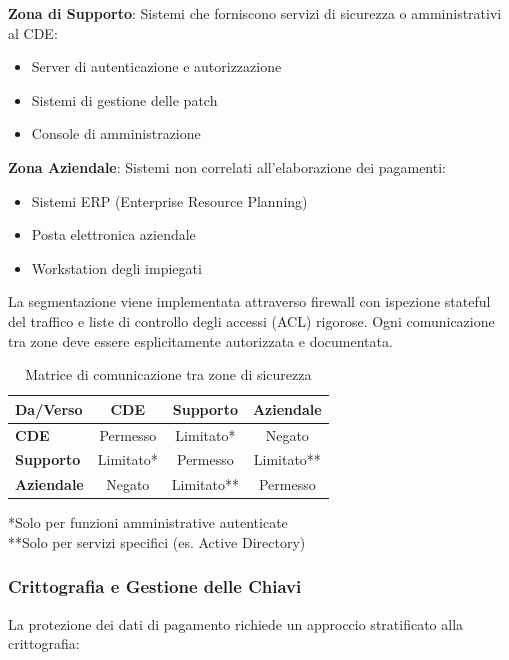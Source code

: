 \textbf{Zona di Supporto}: Sistemi che forniscono servizi di sicurezza o amministrativi al CDE:
\begin{itemize}
    \item Server di autenticazione e autorizzazione
    \item Sistemi di gestione delle patch
    \item Console di amministrazione
\end{itemize}

\textbf{Zona Aziendale}: Sistemi non correlati all'elaborazione dei pagamenti:
\begin{itemize}
    \item Sistemi ERP (Enterprise Resource Planning)
    \item Posta elettronica aziendale
    \item Workstation degli impiegati
\end{itemize}

La segmentazione viene implementata attraverso firewall con ispezione stateful del traffico e liste di controllo degli accessi (ACL) rigorose. Ogni comunicazione tra zone deve essere esplicitamente autorizzata e documentata.

\begin{table}[h]
\centering
\caption{Matrice di comunicazione tra zone di sicurezza}
\label{tab:matrice_comunicazione}
\small
\begin{tabularx}{\textwidth}{|X|c|c|c|}
\hline
\textbf{Da/Verso} & \textbf{CDE} & \textbf{Supporto} & \textbf{Aziendale} \\
\hline
\textbf{CDE} & Permesso & Limitato* & Negato \\
\hline
\textbf{Supporto} & Limitato* & Permesso & Limitato** \\
\hline
\textbf{Aziendale} & Negato & Limitato** & Permesso \\
\hline
\end{tabularx}
\vspace{0.5cm}
\small{*Solo per funzioni amministrative autenticate\\
**Solo per servizi specifici (es. Active Directory)}
\end{table}

\subsubsection{Crittografia e Gestione delle Chiavi}

La protezione dei dati di pagamento richiede un approccio stratificato alla crittografia:

